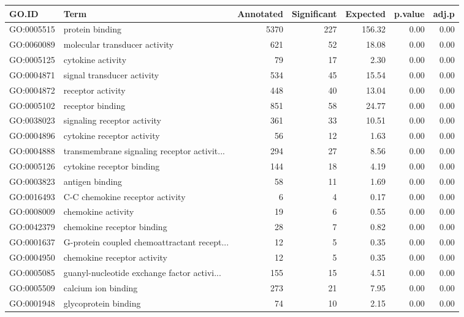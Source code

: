 \begin{table}[ht]
\centering
\begin{tabular}{llrrrrr}
  \hline
GO.ID & Term & Annotated & Significant & Expected & p.value & adj.p \\ 
  \hline
GO:0005515 & protein binding & 5370 & 227 & 156.32 & 0.00 & 0.00 \\ 
  GO:0060089 & molecular transducer activity & 621 &  52 & 18.08 & 0.00 & 0.00 \\ 
  GO:0005125 & cytokine activity &  79 &  17 & 2.30 & 0.00 & 0.00 \\ 
  GO:0004871 & signal transducer activity & 534 &  45 & 15.54 & 0.00 & 0.00 \\ 
  GO:0004872 & receptor activity & 448 &  40 & 13.04 & 0.00 & 0.00 \\ 
  GO:0005102 & receptor binding & 851 &  58 & 24.77 & 0.00 & 0.00 \\ 
  GO:0038023 & signaling receptor activity & 361 &  33 & 10.51 & 0.00 & 0.00 \\ 
  GO:0004896 & cytokine receptor activity &  56 &  12 & 1.63 & 0.00 & 0.00 \\ 
  GO:0004888 & transmembrane signaling receptor activit... & 294 &  27 & 8.56 & 0.00 & 0.00 \\ 
  GO:0005126 & cytokine receptor binding & 144 &  18 & 4.19 & 0.00 & 0.00 \\ 
  GO:0003823 & antigen binding &  58 &  11 & 1.69 & 0.00 & 0.00 \\ 
  GO:0016493 & C-C chemokine receptor activity &   6 &   4 & 0.17 & 0.00 & 0.00 \\ 
  GO:0008009 & chemokine activity &  19 &   6 & 0.55 & 0.00 & 0.00 \\ 
  GO:0042379 & chemokine receptor binding &  28 &   7 & 0.82 & 0.00 & 0.00 \\ 
  GO:0001637 & G-protein coupled chemoattractant recept... &  12 &   5 & 0.35 & 0.00 & 0.00 \\ 
  GO:0004950 & chemokine receptor activity &  12 &   5 & 0.35 & 0.00 & 0.00 \\ 
  GO:0005085 & guanyl-nucleotide exchange factor activi... & 155 &  15 & 4.51 & 0.00 & 0.00 \\ 
  GO:0005509 & calcium ion binding & 273 &  21 & 7.95 & 0.00 & 0.00 \\ 
  GO:0001948 & glycoprotein binding &  74 &  10 & 2.15 & 0.00 & 0.00 \\ 

\end{tabular}
\end{table}
